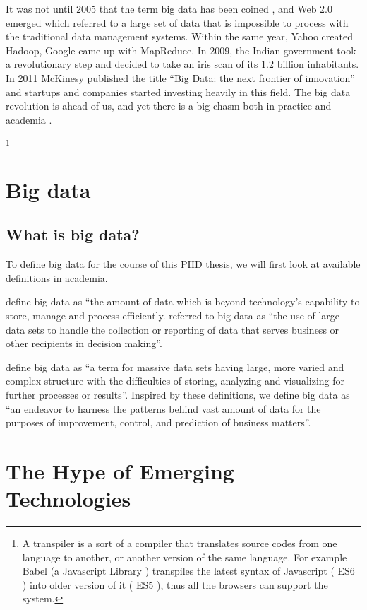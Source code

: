 It was not until 2005 that the term big data has been coined \cite{Long2015}, and Web 2.0 emerged which referred to a large set of data that is impossible to process with the traditional data management systems. Within the same year, Yahoo created Hadoop, Google came up with MapReduce. In 2009, the Indian government took a revolutionary step and decided to take an iris scan of its 1.2 billion inhabitants. In 2011 McKinesy published the title “Big Data: the next frontier of innovation” and startups and companies started investing heavily in this field. The big data revolution is ahead of us, and yet there is a big chasm both in practice and academia \cite{mckinsey2011big}.

\footnote{A transpiler is a sort of a compiler that translates source codes from one language to another, or another version of the same language. For example Babel (a Javascript Library ) transpiles the latest syntax of Javascript ( ES6 ) into older version of it ( ES5 ), thus all the browsers can support the system.}


\section{Big data}\label{sec:Big Data}
\subsection{What is big data?}\label{sec:What is big data?}

To define big data for the course of this PHD thesis, we will first look at available definitions in academia.

\citeauthor{Kaisler2013} define big data as “the amount of data which is beyond technology’s capability to store, manage and process efficiently.
\citeauthor{Srivastava2018} referred to big data as “the use of large data sets to handle the collection or reporting of data that serves business or other recipients in decision making”.

\citeauthor{Sagiroglu2013} define big data as “a term for massive data sets having large, more varied and complex structure with the difficulties of storing, analyzing and visualizing for further processes or results”.  Inspired by these definitions, we define big data as “an endeavor to harness the patterns behind vast amount of data for the purposes of improvement, control, and prediction of business matters”.

\section{The Hype of Emerging Technologies}\label{sec:The Hype of Emerging Technologies}

